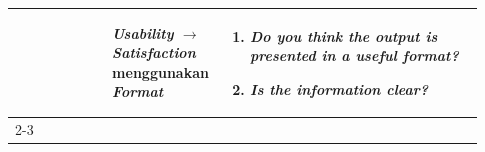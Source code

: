 \begin{longtable}{|p{0.2\linewidth}|p{0.2\linewidth}|p{0.53\linewidth}|}
                                                                  & \textbf{\textit{Usability} $\rightarrow$ \textit{Satisfaction}} menggunakan \textbf{\textit{Format}}                                                    & \begin{enumerate}[before=\vspace{-8pt}, leftmargin=*, nosep, series=SF] \item \textit{Do you think the output is presented in a useful format?} \item \textit{Is the information clear?} \end{enumerate}                                                                                                                                                                                                                                                                                                                                                                                                                                                                                                                                                                                                                                                                                                                                                                                                                                                                                                                                                                                                                                                                                                                                                                                                                     \\
      \cline{2-3}


\end{longtable}
